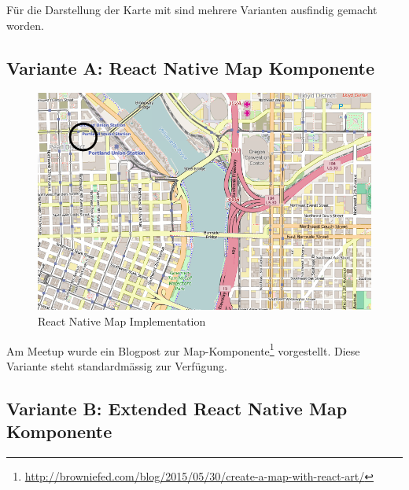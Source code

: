 Für die Darstellung der Karte mit  sind mehrere Varianten ausfindig gemacht worden.

\subsection{Variante A: React Native Map Komponente}

\begin{figure}[H]
	\centering
	\includegraphics[width=\textwidth]{images/technischer_bericht/react-native_mapview.png}
	\caption{React Native Map Implementation}
	\label{image-variante-a-map}
\end{figure}

Am  Meetup wurde ein Blogpost zur  Map-Komponente\footnote{\url{http://browniefed.com/blog/2015/05/30/create-a-map-with-react-art/}} vorgestellt. Diese Variante steht standardmässig zur Verfügung.

\subsection{Variante B: Extended React Native Map Komponente}

